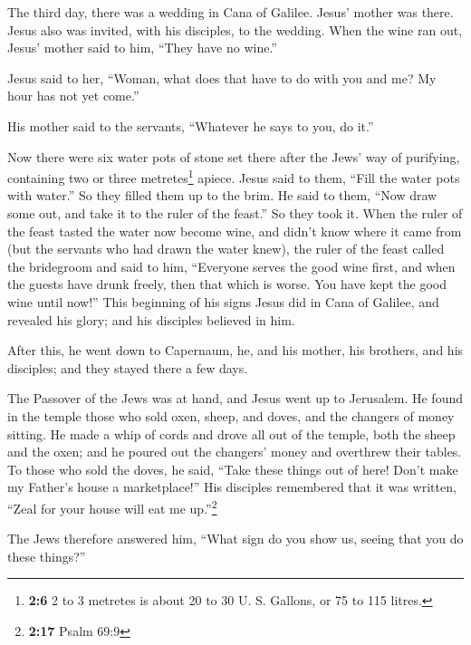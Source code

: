  The third day, there was a wedding in Cana of Galilee.
Jesus' mother was there.  Jesus also was invited, with his
disciples, to the wedding.  When the wine ran out, Jesus'
mother said to him, ``They have no wine.''

 Jesus said to her, ``Woman, what does that have to do
with you and me? My hour has not yet come.''

 His mother said to the servants, ``Whatever he says to
you, do it.''

 Now there were six water pots of stone set there after
the Jews' way of purifying, containing two or three metretes\footnote{\textbf{2:6}
  2 to 3 metretes is about 20 to 30 U. S. Gallons, or 75 to 115 litres.}
apiece.  Jesus said to them, ``Fill the water pots with
water.'' So they filled them up to the brim.  He said to
them, ``Now draw some out, and take it to the ruler of the feast.'' So
they took it.  When the ruler of the feast tasted the
water now become wine, and didn't know where it came from (but the
servants who had drawn the water knew), the ruler of the feast called
the bridegroom  and said to him, ``Everyone serves the
good wine first, and when the guests have drunk freely, then that which
is worse. You have kept the good wine until now!''  This
beginning of his signs Jesus did in Cana of Galilee, and revealed his
glory; and his disciples believed in him.

 After this, he went down to Capernaum, he, and his
mother, his brothers, and his disciples; and they stayed there a few
days.

 The Passover of the Jews was at hand, and Jesus went up
to Jerusalem.  He found in the temple those who sold
oxen, sheep, and doves, and the changers of money sitting.
 He made a whip of cords and drove all out of the temple,
both the sheep and the oxen; and he poured out the changers' money and
overthrew their tables.  To those who sold the doves, he
said, ``Take these things out of here! Don't make my Father's house a
marketplace!''  His disciples remembered that it was
written, ``Zeal for your house will eat me up.''\footnote{\textbf{2:17}
  Psalm 69:9}

 The Jews therefore answered him, ``What sign do you show
us, seeing that you do these things?''

